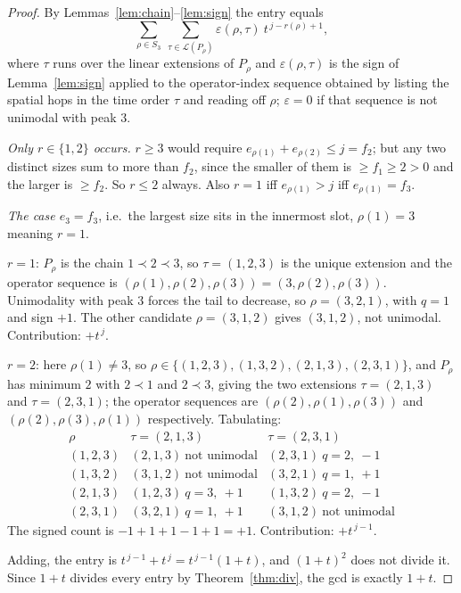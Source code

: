 \documentclass[11pt]{article}
\theoremstyle{definition}
\begin{document}
\begin{proof}
By Lemmas~\ref{lem:chain}--\ref{lem:sign} the entry equals
\[
\sum_{\rho\in S_3}\ \sum_{\tau\in\mathcal L(P_\rho)} \varepsilon(\rho,\tau)\ t^{\,j-r(\rho)+1},
\]
where $\tau$ runs over the linear extensions of $P_\rho$ and $\varepsilon(\rho,\tau)$ is the sign
of Lemma~\ref{lem:sign} applied to the operator-index sequence obtained by listing the spatial
hops in the time order $\tau$ and reading off $\rho$; $\varepsilon=0$ if that sequence is not
unimodal with peak $3$.

\emph{Only $r\in\{1,2\}$ occurs.} $r\ge3$ would require $e_{\rho(1)}+e_{\rho(2)}\le j=f_2$; but
any two distinct sizes sum to more than $f_2$, since the smaller of them is $\ge f_1\ge2>0$ and
the larger is $\ge f_2$. So $r\le2$ always. Also $r=1$ iff $e_{\rho(1)}>j$ iff
$e_{\rho(1)}=f_3$.

\emph{The case $e_3=f_3$}, i.e.\ the largest size sits in the innermost slot, $\rho(1)=3$ meaning
$r=1$.

$r=1$: $P_\rho$ is the chain $1\prec2\prec3$, so $\tau=(1,2,3)$ is the unique extension and the
operator sequence is $(\rho(1),\rho(2),\rho(3))=(3,\rho(2),\rho(3))$. Unimodality with peak $3$
forces the tail to decrease, so $\rho=(3,2,1)$, with $q=1$ and sign $+1$. The other candidate
$\rho=(3,1,2)$ gives $(3,1,2)$, not unimodal. Contribution: $+t^{\,j}$.

$r=2$: here $\rho(1)\ne3$, so $\rho\in\{(1,2,3),(1,3,2),(2,1,3),(2,3,1)\}$, and $P_\rho$ has
minimum $2$ with $2\prec1$ and $2\prec3$, giving the two extensions $\tau=(2,1,3)$ and
$\tau=(2,3,1)$; the operator sequences are $(\rho(2),\rho(1),\rho(3))$ and
$(\rho(2),\rho(3),\rho(1))$ respectively. Tabulating:
\[
\begin{array}{c|cc}
\rho & \tau=(2,1,3) & \tau=(2,3,1)\\\hline
(1,2,3) & (2,1,3)\ \text{not unimodal} & (2,3,1)\ q=2,\ -1\\
(1,3,2) & (3,1,2)\ \text{not unimodal} & (3,2,1)\ q=1,\ +1\\
(2,1,3) & (1,2,3)\ q=3,\ +1 & (1,3,2)\ q=2,\ -1\\
(2,3,1) & (3,2,1)\ q=1,\ +1 & (3,1,2)\ \text{not unimodal}
\end{array}
\]
The signed count is $-1+1+1-1+1=+1$. Contribution: $+t^{\,j-1}$.

Adding, the entry is $t^{\,j-1}+t^{\,j}=t^{\,j-1}(1+t)$, and $(1+t)^2$ does not divide it. Since
$1+t$ divides every entry by Theorem~\ref{thm:div}, the gcd is exactly $1+t$.


\end{proof}
\end{document}
